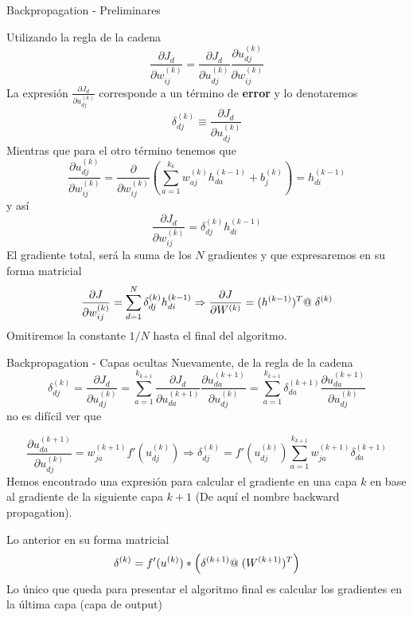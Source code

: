 \documentclass[9pt]{beamer}
\begin{document}
\begin{frame}{Backpropagation - Preliminares}

Utilizando la regla de la cadena 
\[
\frac{\partial J_d}{\partial w_{ij}^{(k)}} = \frac{\partial J_d}{\partial u_{dj}^{(k)}}\frac{\partial u_{dj}^{(k)}}{\partial w_{ij}^{(k)}}
\] \pause
La expresión $\frac{\partial J_d}{\partial u_{dj}^{(k)}}$ corresponde a un término de \textbf{error} y lo denotaremos \
\[
\delta_{dj}^{(k)} \equiv \frac{\partial J_d}{\partial u_{dj}^{(k)}}
\] \pause
Mientras que para el otro término tenemos que 
\[
\frac{\partial u_{dj}^{(k)}}{\partial w_{ij}^{(k)}} = \frac{\partial}{\partial w_{ij}^{(k)}} \left ( \sum_{a = 1}^{k_k}w_{aj}^{(k)}h_{da}^{(k-1)} + b_j^{(k)} \right) = h_{di}^{(k-1)}
\] \pause
y así 
\[
\frac{\partial J_d}{\partial w_{ij}^{(k)}} = \delta_{dj}^{(k)}  h_{di}^{(k-1)}
\] \pause
El gradiente total, será la suma de los $N$ gradientes y que expresaremos en su forma matricial
\[\frac{\partial J}{\partial w_{ij}^{(k)}} = \sum_{d=1}^N \delta_{dj}^{(k)}  h_{di}^{(k-1)}  \Rightarrow  \frac{\partial J}{\partial W^{(k)}} = (h^{(k-1)})^T @ \hspace{0.1cm} \delta^{(k)}
\]
Omitiremos la constante $1/N$ hasta el final del algoritmo.
\end{frame}
\begin{frame}{Backpropagation - Capas ocultas}
Nuevamente, de la regla de la cadena \pause
\[
\delta_{dj}^{(k)} = \frac{\partial J_d}{\partial u_{dj}^{(k)}} = \sum_{a=1}^{k_{k+1}} \frac{\partial J_d}{\partial u_{da}^{(k+1)}} \frac{\partial u_{da}^{(k+1)}}{\partial u_{dj}^{(k)}} = \sum_{a=1}^{k_{k+1}} \delta_{da}^{(k+1)} \frac{\partial u_{da}^{(k+1)}}{\partial u_{dj}^{(k)}}
\] 
\pause 
no es difícil ver que

\[
\frac{\partial u_{da}^{(k+1)}}{\partial u_{dj}^{(k)}} = w_{ja}^{(k+1)}f'(u_{dj}^{(k)})  \Rightarrow  \delta_{dj}^{(k)} = f'(u_{dj}^{(k)})\sum_{a=1}^{k_{k+1}}w_{ja}^{(k+1)}\delta_{da}^{(k+1)}
\]
\pause
Hemos encontrado una expresión para calcular el gradiente en una capa $k$ en base al gradiente de la siguiente capa $k+1$ (De aquí el nombre backward propagation).
\newline \pause

Lo anterior en su forma matricial
\[
\delta^{(k)} = f'(u^{(k)}) * \left ( \delta^{(k+1)} @ \hspace{0.1cm} (W^{(k+1)})^T \right )
\] \pause
Lo único que queda para presentar el algoritmo final es calcular los gradientes en la última capa (capa de output)

\end{frame}
\end{document}
